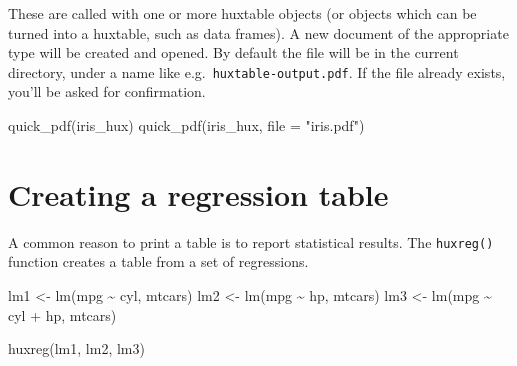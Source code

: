 \documentclass[
]{article}
\newenvironment{Shaded}{\begin{snugshade}}{\end{snugshade}}
\newcommand{\AttributeTok}[1]{\textcolor[rgb]{0.77,0.63,0.00}{#1}}
\newcommand{\FunctionTok}[1]{\textcolor[rgb]{0.00,0.00,0.00}{#1}}
\newcommand{\NormalTok}[1]{#1}
\newcommand{\OtherTok}[1]{\textcolor[rgb]{0.56,0.35,0.01}{#1}}
\newcommand{\SpecialCharTok}[1]{\textcolor[rgb]{0.00,0.00,0.00}{#1}}
\newcommand{\StringTok}[1]{\textcolor[rgb]{0.31,0.60,0.02}{#1}}
\begin{document}
These are called with one or more huxtable objects (or objects which can
be turned into a huxtable, such as data frames). A new document of the
appropriate type will be created and opened. By default the file will be
in the current directory, under a name like
e.g.~\texttt{huxtable-output.pdf}. If the file already exists, you'll be
asked for confirmation.

\begin{Shaded}
\begin{Highlighting}[]
\FunctionTok{quick\_pdf}\NormalTok{(iris\_hux) }
\FunctionTok{quick\_pdf}\NormalTok{(iris\_hux, }\AttributeTok{file =} \StringTok{"iris.pdf"}\NormalTok{)}
\end{Highlighting}
\end{Shaded}

\FloatBarrier

\hypertarget{creating-a-regression-table}{%
\section{Creating a regression
table}\label{creating-a-regression-table}}

A common reason to print a table is to report statistical results. The
\texttt{huxreg()} function creates a table from a set of regressions.

\begin{Shaded}
\begin{Highlighting}[]
\NormalTok{lm1 }\OtherTok{\textless{}{-}} \FunctionTok{lm}\NormalTok{(mpg }\SpecialCharTok{\textasciitilde{}}\NormalTok{ cyl, mtcars)}
\NormalTok{lm2 }\OtherTok{\textless{}{-}} \FunctionTok{lm}\NormalTok{(mpg }\SpecialCharTok{\textasciitilde{}}\NormalTok{ hp, mtcars)}
\NormalTok{lm3 }\OtherTok{\textless{}{-}} \FunctionTok{lm}\NormalTok{(mpg }\SpecialCharTok{\textasciitilde{}}\NormalTok{ cyl }\SpecialCharTok{+}\NormalTok{ hp, mtcars)}

\FunctionTok{huxreg}\NormalTok{(lm1, lm2, lm3)}
\end{Highlighting}
\end{Shaded}

 
  \providecommand{\huxb}[2]{\arrayrulecolor[RGB]{#1}\global\arrayrulewidth=#2pt}
  \providecommand{\huxvb}[2]{\color[RGB]{#1}\vrule width #2pt}
  \providecommand{\huxtpad}[1]{\rule{0pt}{#1}}
  \providecommand{\huxbpad}[1]{\rule[-#1]{0pt}{#1}}
\end{document}
